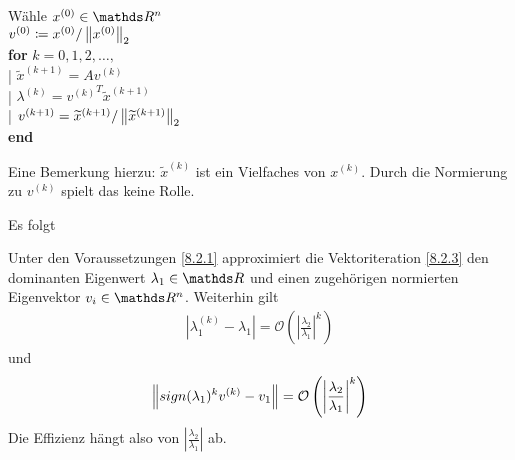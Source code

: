 \label{8.2.3}
\begin{pseudocode}{0.5\linewidth}
  Wähle $x^{(0)}\in\R^n$ \\
  $v^{(0)}\coloneqq x^{(0)}/\left\| x^{(0)} \right\|_2$ \\
  \textbf{for} $k=0,1,2,\ldots, $ \\
  |\> $\widetilde{x}^{(k+1)}= Av^{(k)}$ \\
  |\> $\lambda^{(k)} = {v^{(k)}}^T\widetilde{x}^{(k+1)}$ \\
  |\> $v^{(k+1)} = \widetilde{x}^{(k+1)}/\left\| \widetilde{x}^{(k+1)} \right\|_2$
  \\
  \textbf{end}
\end{pseudocode}

Eine Bemerkung hierzu:
$\widetilde{x}^{(k)}$ ist ein Vielfaches von $x^{(k)}$.
Durch die Normierung zu $v^{(k)}$ spielt das keine Rolle.

Es folgt

\begin{Satze}\label{8.2.4}
  Unter den Voraussetzungen \ref{8.2.1} approximiert
  die Vektoriteration \ref{8.2.3} den dominanten Eigenwert
  $\lambda_1\in\R$ und einen zugehörigen 
  normierten Eigenvektor $v_i\in\R^n$.
Weiterhin gilt
\begin{gather*}
  \left| \lambda_1^{(k)}-\lambda_1\right|
  =\mathcal{O}\left(\left|
        \frac{\lambda_2}{\lambda_1}
        \right|^k\right)
\end{gather*}
und
\begin{gather*}
  \left\| sign(\lambda_1)^k v^{(k)}-v_1 \right\|
  =\mathcal{O}\left( \left|
        \frac{\lambda_2}{\lambda_1}
        \right|^k \right)
\end{gather*}
Die Effizienz hängt also von 
$\left|\frac{\lambda_2}{\lambda_1}\right|$ ab.
\end{Satze}

